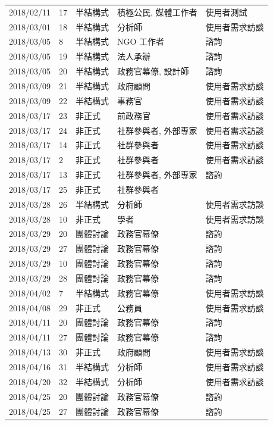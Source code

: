 \documentclass[12pt,a4paper]{article}
\begin{document}
{\begin{longtable}{l|l|l|l|l}
2018/02/11 & 17 & 半結構式 & 積極公民, 媒體工作者 & 使用者測試\\
2018/03/01 & 18 & 半結構式 & 分析師 & 使用者需求訪談\\
2018/03/05 & 8 & 半結構式 & NGO 工作者 & 諮詢\\
2018/03/05 & 19 & 半結構式 & 法人承辦 & 諮詢\\
2018/03/05 & 20 & 半結構式 & 政務官幕僚, 設計師 & 諮詢\\
2018/03/09 & 21 & 半結構式 & 政府顧問 & 使用者需求訪談\\
2018/03/09 & 22 & 半結構式 & 事務官 & 使用者需求訪談\\
2018/03/17 & 23 & 非正式 & 前政務官 & 使用者需求訪談\\
2018/03/17 & 24 & 非正式 & 社群參與者, 外部專家 & 使用者需求訪談\\
2018/03/17 & 14 & 非正式 & 社群參與者 & 使用者需求訪談\\
2018/03/17 & 2 & 非正式 & 社群參與者 & 使用者需求訪談\\
2018/03/17 & 13 & 非正式 & 社群參與者, 外部專家 & 諮詢\\
2018/03/17 & 25 & 非正式 & 社群參與者 & \\
2018/03/28 & 26 & 半結構式 & 分析師 & 使用者需求訪談\\
2018/03/28 & 10 & 非正式 & 學者 & 使用者需求訪談\\
2018/03/29 & 20 & 團體討論 & 政務官幕僚 & 諮詢\\
2018/03/29 & 27 & 團體討論 & 政務官幕僚 & 諮詢\\
2018/03/29 & 10 & 團體討論 & 政務官幕僚 & 諮詢\\
2018/03/29 & 28 & 團體討論 & 政務官幕僚 & 諮詢\\
2018/04/02 & 7 & 半結構式 & 政務官幕僚 & 使用者需求訪談\\
2018/04/08 & 29 & 非正式 & 公務員 & 使用者需求訪談\\
2018/04/11 & 20 & 團體討論 & 政務官幕僚 & 諮詢\\
2018/04/11 & 27 & 團體討論 & 政務官幕僚 & 諮詢\\
2018/04/13 & 30 & 非正式 & 政府顧問 & 使用者需求訪談\\
2018/04/16 & 31 & 半結構式 & 分析師 & 使用者需求訪談\\
2018/04/20 & 32 & 半結構式 & 分析師 & 使用者需求訪談\\
2018/04/25 & 20 & 團體討論 & 政務官幕僚 & 諮詢\\
2018/04/25 & 27 & 團體討論 & 政務官幕僚 & 諮詢\\

\end{longtable}}
\end{document}
